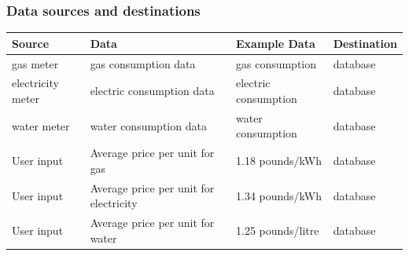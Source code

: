 \subsubsection{Data sources and destinations}
\begin{center}
\begin{tabular}{|l|l|l|l|}
	\hline
	\textbf{Source} & \textbf{Data} & \textbf{Example Data} & \textbf{Destination} \\ \hline
	gas meter & gas consumption data & gas consumption & database \\ \hline
 	electricity meter & electric consumption data & electric consumption & database \\ \hline
	water meter & water consumption data & water consumption & database \\ \hline
	User input & Average price per unit for gas & 1.18 pounds/kWh & database \\ \hline
 	User input & Average price per unit for electricity & 1.34 pounds/kWh & database \\ \hline
	User input & Average price per unit for water & 1.25 pounds/litre & database \\ \hline
\end{tabular}
\label{tab:Data sources and destinations for the proposed system}
\end{center}

